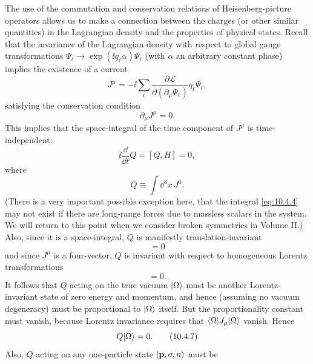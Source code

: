 The use of the commutation and conservation relations of Heisenberg-picture
operators allows us to make a connection between the charges (or other similar
quantities) in the Lagrangian density and the properties of physical states.
Recall that the invariance of the Lagrangian density with respect to global
gauge transformations $\Psi_\ell\to\exp(\ii q_\ell\alpha)\Psi_\ell$ (with
$\alpha$ an arbitrary constant phase) implies the existence of a current
\begin{equation}
J^\mu=-\ii\sum_\ell
\frac{\partial\mathcal L}{\partial(\partial_\mu\Psi_\ell)}
q_\ell\Psi_\ell,
\tag{10.4.1}\label{eq:10.4.1}
\end{equation}
satisfying the conservation condition
\begin{equation}
\partial_\mu J^\mu=0.
\tag{10.4.2}\label{eq:10.4.2}
\end{equation}
This implies that the space-integral of the time component of $J^\mu$ is
time-independent:
\begin{equation}
\ii\frac{\dd}{\dd t}Q=[Q,H]=0,
\tag{10.4.3}\label{eq:10.4.3}
\end{equation}
where
\begin{equation}
Q\equiv\int \dd^3x\,J^0.
\tag{10.4.4}\label{eq:10.4.4}
\end{equation}
(There is a very important possible exception here, that the integral
\eqref{eq:10.4.4} may not exist if there are long-range forces due to massless
scalars in the system. We will return to this point when we consider broken
symmetries in Volume II.) Also, since it is a space-integral, $Q$ is manifestly
translation-invariant
\begin{equation}
[\mathbf P,Q]=0
\tag{10.4.5}\label{eq:10.4.5}
\end{equation}
and since $J^\mu$ is a four-vector, $Q$ is invariant with respect to
homogeneous Lorentz transformations
\begin{equation}
[J^{\mu\nu},Q]=0.
\tag{10.4.6}\label{eq:10.4.6}
\end{equation}
It follows that $Q$ acting on the true vacuum $\lvert \Omega\rangle$ must be another
Lorentz-invariant state of zero energy and momentum, and hence (assuming no
vacuum degeneracy) must be proportional to $\lvert \Omega\rangle$ itself. But the
proportionality constant must vanish, because Lorentz invariance requires that
$\langle \Omega\rvert J_\mu\lvert \Omega\rangle$ vanish. Hence
\begin{equation}
Q\lvert \Omega\rangle=0.
\tag{10.4.7}\label{eq:10.4.7}
\end{equation}
Also, $Q$ acting on any one-particle state $\lvert \mathbf p,\sigma,n\rangle$ must be
